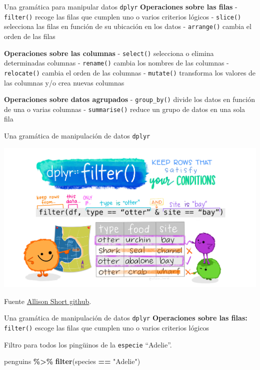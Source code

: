 \documentclass[
  ignorenonframetext,
  aspectratio=169]{beamer}
\newenvironment{Shaded}{\begin{snugshade}}{\end{snugshade}}
\newcommand{\FunctionTok}[1]{\textcolor[rgb]{0.13,0.29,0.53}{\textbf{#1}}}
\newcommand{\NormalTok}[1]{#1}
\newcommand{\SpecialCharTok}[1]{\textcolor[rgb]{0.81,0.36,0.00}{\textbf{#1}}}
\newcommand{\StringTok}[1]{\textcolor[rgb]{0.31,0.60,0.02}{#1}}
\begin{document}
\begin{frame}[fragile]{Una gramática para manipular datos
\texttt{dplyr}}
\label{una-gramuxe1tica-para-manipular-datos-dplyr-2}
\textbf{Operaciones sobre las filas} - \texttt{filter()} recoge las
filas que cumplen uno o varios criterios lógicos - \texttt{slice()}
selecciona las filas en función de su ubicación en los datos -
\texttt{arrange()} cambia el orden de las filas

\textbf{Operaciones sobre las columnas} - \texttt{select()} selecciona o
elimina determinadas columnas - \texttt{rename()} cambia los nombres de
las columnas - \texttt{relocate()} cambia el orden de las columnas -
\texttt{mutate()} transforma los valores de las columnas y/o crea nuevas
columnas

\textbf{Operaciones sobre datos agrupados} - \texttt{group\_by()} divide
los datos en función de una o varias columnas - \texttt{summarise()}
reduce un grupo de datos en una sola fila
\end{frame}

\begin{frame}{Una gramática de manipulación de datos \texttt{dplyr}}
\label{una-gramuxe1tica-de-manipulaciuxf3n-de-datos-dplyr}
\begin{center}\includegraphics[width=0.8\linewidth]{Imgs/dplyr_filter} \end{center}

Fuente
\href{https://github.com/allisonhorst/stats-illustrations}{Allison Short
github}.
\end{frame}

\begin{frame}[fragile]{Una gramática de manipulación de datos
\texttt{dplyr}}
\label{una-gramuxe1tica-de-manipulaciuxf3n-de-datos-dplyr-1}
\textbf{Operaciones sobre las filas:} \texttt{filter()} escoge las filas
que cumplen uno o varios criterios lógicos

Filtro para todos los pingüinos de la \texttt{especie} ``Adelie''.

\begin{Shaded}
\begin{Highlighting}[]
\NormalTok{penguins }\SpecialCharTok{\%\textgreater{}\%} 
  \FunctionTok{filter}\NormalTok{(species }\SpecialCharTok{==} \StringTok{"Adelie"}\NormalTok{)}
\end{Highlighting}
\end{Shaded}
\end{frame}
\end{document}
